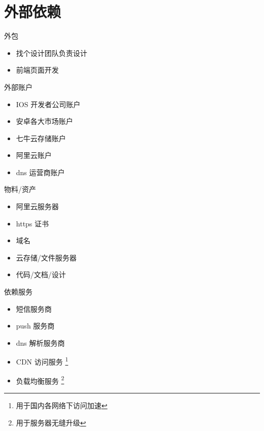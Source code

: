 \documentclass[presentation, bigger]{beamer}
\begin{document}
\section{外部依赖}
\label{sec:org331d6ed}
\begin{frame}[label={sec:org6110ebb}]{外包}
\begin{itemize}
\item 找个设计团队负责设计
\item 前端页面开发
\end{itemize}
\end{frame}
\begin{frame}[label={sec:org286821f}]{外部账户}
\begin{itemize}
\item IOS 开发者公司账户
\item 安卓各大市场账户
\item 七牛云存储账户
\item 阿里云账户
\item dns 运营商账户
\end{itemize}
\end{frame}

\begin{frame}[label={sec:org05c8b32}]{物料/资产}
\begin{itemize}
\item 阿里云服务器
\item https 证书
\item 域名
\item 云存储/文件服务器
\item 代码/文档/设计
\end{itemize}
\end{frame}

\begin{frame}[label={sec:org18a6109}]{依赖服务}
\begin{itemize}
\item 短信服务商
\item push 服务商
\item dns 解析服务商
\item CDN 访问服务 \footnote{用于国内各网络下访问加速}
\item 负载均衡服务 \footnote{用于服务器无缝升级}
\end{itemize}
\end{frame}
\end{document}
